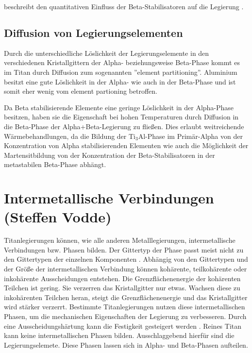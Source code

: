 \documentclass[a4paper, 11pt]{tubsreprt}
\begin{document}
beschreibt den quantitativen Einfluss der Beta-Stabilisatoren auf die Legierung \cite{Luetjering2007}.

\subsection{Diffusion von Legierungselementen}\label{Kapitel Diffusion von legierungselementen}
Durch die unterschiedliche Löslichkeit der Legierungselemente in den verschiedenen Kristallgittern der Alpha- beziehungsweise Beta-Phase kommt es im Titan durch Diffusion zum sogenannten ''element partitioning''. Aluminium besitzt eine gute Löslichkeit in der Alpha- wie auch in der Beta-Phase und ist somit eher wenig vom element partioning betroffen.

Da Beta stabilisierende Elemente eine geringe Löslichkeit in der Alpha-Phase besitzen, haben sie die Eigenschaft bei hohen Temperaturen durch Diffusion in die Beta-Phase der Alpha+Beta-Legierung zu fließen. Dies erlaubt weitreichende Wärmebehandlungen, da die Bildung der Ti$_{3}$Al-Phase im Primär-Alpha von der Konzentration von Alpha stabilisierenden Elementen wie auch die Möglichkeit der Martensitbildung von der Konzentration der Beta-Stabilisatoren in der metastabilen Beta-Phase abhängt.
\newpage

\section{Intermetallische Verbindungen (Steffen Vodde)}
Titanlegierungen können, wie alle anderen Metalllegierungen, intermetallische Verbindungen bzw. Phasen bilden. Der Gittertyp der Phase passt meist nicht zu den Gittertypen der einzelnen Komponenten \cite[vgl.]{Domke1986}. Abhängig von den Gittertypen und der Größe der intermetallischen Verbindung können kohärente, teilkohärente oder inkohärente Ausscheidungen entstehen. Die Grenzflächenenergie der kohärenten Teilchen ist gering. Sie verzerren das Kristallgitter nur etwas. Wachsen diese zu inkohärenten Teilchen heran, steigt die Grenzflächenenergie und das Kristallgitter wird stärker verzerrt. 
Bestimmte Titanlegierungen nutzen diese intermetallischen Phasen, um die mechanischen Eigenschaften der Legierung zu verbesseren. Durch eine Ausscheidungshärtung kann die Festigkeit gesteigert werden \cite{Luetjering2007}. Reines Titan kann keine intermetallischen Phasen bilden. Ausschlaggebend hierfür sind die Legierungselemete. Diese Phasen lassen sich in Alpha- und Beta-Phasen aufteilen.  
 
\end{document}
